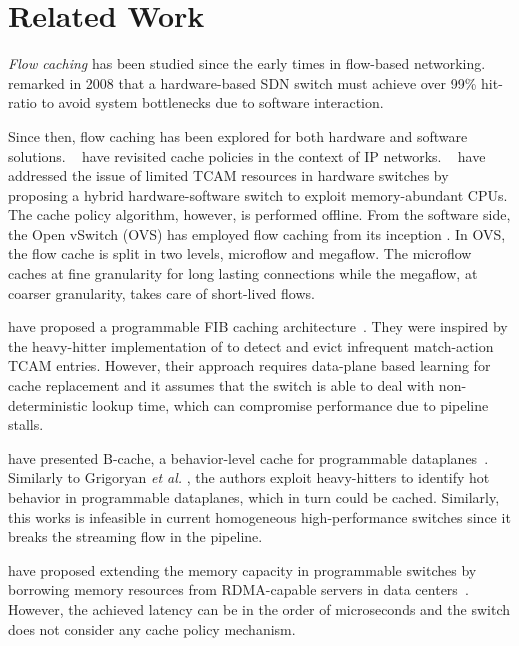 \section{Related Work}\label{sec:related_works}

\textit{Flow caching} has been studied since the early times in flow-based networking.
\citeauthor{casado:2008}~\cite{casado:2008} remarked in 2008 that a hardware-based SDN switch must achieve over 99\% hit-ratio to avoid system bottlenecks due to software interaction.

Since then, flow caching has been explored for both hardware and software solutions.
\citeauthor{Kim:09}~\cite{Kim:09} have revisited cache policies in the context of IP networks.
\citeauthor{Katta:2014}~\cite{Katta:2014,Katta:2016} have addressed the issue of limited TCAM resources in hardware switches by proposing a hybrid hardware-software switch to exploit memory-abundant CPUs.
The cache policy algorithm, however, is performed offline. 
From the software side, the Open vSwitch (OVS) has employed flow caching from its inception \cite{Pfaff:15}.
In OVS, the flow cache is split in two levels, microflow and megaflow.
The microflow caches at fine granularity for long lasting connections while the megaflow, at coarser granularity, takes care of short-lived flows.

\citeauthor{Grigoryan:18} have proposed a programmable FIB caching architecture~\cite{Grigoryan:18}. They were inspired by the heavy-hitter implementation of \cite{Sivaraman:17} to detect and evict infrequent match-action TCAM entries. However, their approach requires data-plane based learning for cache replacement and it assumes that the switch is able to deal with non-deterministic lookup time, which can compromise performance due to pipeline stalls. 

\citeauthor{Zhang:2018} have presented B-cache, a behavior-level cache for programmable dataplanes~\cite{Zhang:2018}. Similarly to Grigoryan \textit{et al.} \cite{Grigoryan:18}, the authors exploit heavy-hitters to identify hot behavior in programmable dataplanes, which in turn could be cached. Similarly, this works is infeasible in current homogeneous high-performance switches since it breaks the streaming flow in the pipeline.

\citeauthor{Kim:2018} have proposed extending the memory capacity in programmable switches by borrowing memory resources from RDMA-capable servers in data centers~\cite{Kim:2018}. However, the achieved latency can be in the order of microseconds and the switch does not consider any cache policy mechanism.

